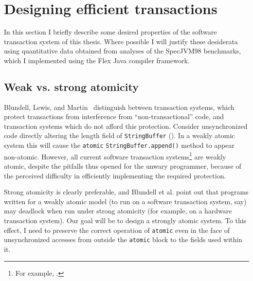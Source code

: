 \section{Designing efficient transactions}\label{sec:efficient}

In this section I briefly describe some desired properties of the
software transaction system of this thesis.  Where possible I will
justify these desiderata using quantitative data obtained from
analyses of the SpecJVM98 benchmarks, which I implemented using the
Flex Java compiler framework.

\subsection{Weak vs. strong atomicity}
Blundell, Lewis, and Martin~\cite{BlundellLeMa05} distinguish
between 
transaction systems, which protect transactions from interference from
``non-transactional'' code, and  transaction
systems which do not afford this protection.
Consider unsynchronized code directly altering the length field of
{\tt StringBuffer} ().  In a weakly atomic system
this will cause the {\tt atomic} {\tt StringBuffer.append()} method to
appear non-atomic.  However,
all current software transaction systems\footnote{For example,
  \cite{HarrisFr03}.} are weakly atomic, despite
the pitfalls thus opened for the unwary programmer, because of the
perceived difficulty in efficiently implementing the required protection.

Strong atomicity is clearly preferable, and Blundell et al. point out
that programs written for a weakly atomic model (to run on a software
transaction system, say) may deadlock when run under strong atomicity
(for example, on a hardware transaction system).  Our goal will be to
design a strongly atomic system.
To this effect, I need to preserve the
correct operation of {\tt atomic} even in the face of unsynchronized
accesses from outside the {\tt atomic} block to the fields used within
it.  


